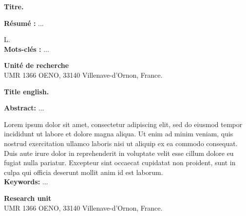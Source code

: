 {
\pagestyle{empty}
\begin{small}
\linespread{1.05}\selectfont
\begin{center}
\textbf{Titre.}
\end{center}

\textbf{Résumé :} 
...

L.\newline
\\
\textbf{Mots-clés :} ... \\

\vspace{0.4cm}
\noindent\makebox[\linewidth]{\rule{\textwidth}{0.4pt}}

\vfill
\begin{center}
\textbf{Unité de recherche} \\
UMR 1366 OENO, 33140 Villenave-d'Ornon, France.
\end{center}
\end{small}

\cleardoublepage                     %

\begin{small}
\linespread{1.05}\selectfont
\begin{center}
\textbf{Title english.}
\end{center}

\textbf{Abstract:} 
...

Lorem ipsum dolor sit amet, consectetur adipiscing elit, sed do eiusmod tempor incididunt ut labore et dolore magna aliqua. Ut enim ad minim veniam, quis nostrud exercitation ullamco laboris nisi ut aliquip ex ea commodo consequat. Duis aute irure dolor in reprehenderit in voluptate velit esse cillum dolore eu fugiat nulla pariatur. Excepteur sint occaecat cupidatat non proident, sunt in culpa qui officia deserunt mollit anim id est laborum.\newline
\\
\textbf{Keywords:} ... \\

\vspace{0.4cm}
\noindent\makebox[\linewidth]{\rule{\textwidth}{0.4pt}}

\vfill
\begin{center}
\textbf{Research unit} \\
UMR 1366 OENO, 33140 Villenave-d'Ornon, France.
\end{center}
\end{small}

\restoregeometry}
\cleardoublepage                     %